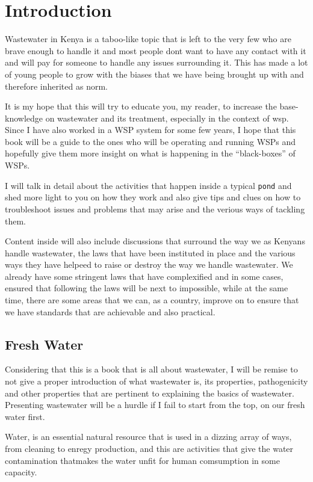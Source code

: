 \chapter{Introduction}
Wastewater in Kenya is a taboo-like topic that is left to the very few who are brave enough to handle it and most people dont want to have any contact with it and will pay for someone to handle any issues surrounding it. This has made a lot of young people to grow with the biases that we have being brought up with and therefore inherited as norm.

It is my hope that this will try to educate you, my reader, to increase the base-knowledge on wastewater and its treatment, especially in the context of \gls{wsp}. Since I have also worked in a WSP system for some few years, I hope that this book will be a guide to the ones who will be operating and running WSPs and hopefully give them more insight on what is happening in the \enquote{black-boxes} of WSPs.

I will talk in detail about the activities that happen inside a typical \texttt{pond} and shed more light to you on how they work and also give tips and clues on how to troubleshoot issues and problems that may arise and the verious ways of tackling them.

Content inside will also include discussions that surround the way we as Kenyans handle wastewater, the laws that have been instituted in place and the various ways they have helpeed to raise or destroy the way we handle wastewater. We already have some stringent laws that have complexified and in some cases, ensured that following the laws will be next to impossible, while at the same time, there are some areas that we can, as a country, improve on to ensure that we have standards that are achievable and also practical.

\section{Fresh Water}
Considering that this is a book that is all about wastewater, I will be remise to not give a proper introduction of what wastewater is, its properties, pathogenicity and other properties that are pertinent to explaining the basics of wastewater. Presenting wastewater will be a hurdle if I fail to start from the top, on our fresh water first.

Water, is an essential natural resource that is used in a dizzing array of ways, from cleaning to enregy production, and this are activities that give the water contamination thatmakes the water unfit for human comsumption in some capacity.

